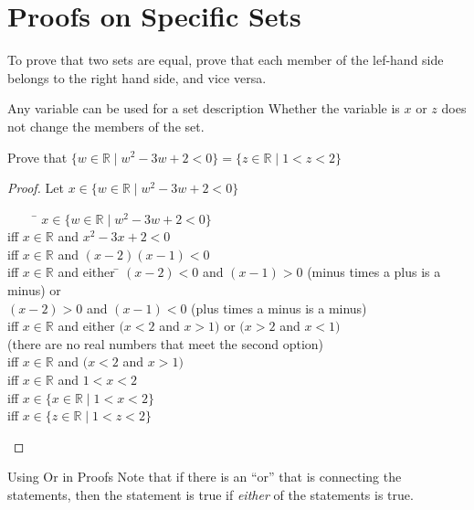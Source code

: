 \documentclass[../notes.tex]{subfiles}
\begin{document}
		\section{Proofs on Specific Sets}
			To prove that two sets are equal, prove that each member of the lef-hand side belongs to the right hand side, and vice versa.
			\begin{sidenote}{Any variable can be used for a set description}
				Whether the variable is $x$ or $z$ does not change the members of the set.
			\end{sidenote}
			\begin{example}
				Prove that $\{w \in \mathbb{R} \mid w^{2} - 3w + 2 < 0\} = \{z \in \mathbb{R} \mid 1 < z < 2\}$
				\begin{proof}
					Let $x \in \{w \in \mathbb{R} \mid w^{2} - 3w + 2 < 0\}$
					\begin{tabbing}
						$\qquad$ \= $x \in \{w \in \mathbb{R} \mid w^{2} - 3w + 2 < 0\}$\\
						iff      \> $x \in \mathbb{R}$ and $x^{2} - 3x + 2 < 0$\\
						iff      \> $x \in \mathbb{R}$ and $(x - 2)(x - 1) < 0$\\
						iff      \> $x \in \mathbb{R}$ and either \= $(x - 2) < 0$ and $(x - 1) > 0$ (minus times a plus is a minus) or\\
						         \>                               \> $(x - 2) > 0$ and $(x - 1) < 0$ (plus times a minus is a minus)\\
						iff      \> $x \in \mathbb{R}$ and either \> $(x < 2$ and $x > 1)$ or $(x > 2$ and $x < 1)$\\
										 \>                               \> (there are no real numbers that meet the second option)\\
						iff      \> $x \in \mathbb{R}$ and $(x < 2$ and $x > 1)$\\
						iff      \> $x \in \mathbb{R}$ and $1 < x < 2$\\
						iff      \> $x \in \{x \in \mathbb{R} \mid 1 < x < 2\}$\\
						iff      \> $x \in \{z \in \mathbb{R} \mid 1 < z < 2\}$
					\end{tabbing}
				\end{proof}
			\end{example}
			\begin{sidenote}{Using Or in Proofs}
				Note that if there is an ``or'' that is connecting the statements, then the statement is true if \emph{either} of the statements is true.
			\end{sidenote}
\end{document}
